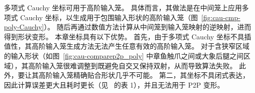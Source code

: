 多项式 Cauchy 坐标可用于高阶输入笼。
具体而言，其做法是在中间笼上应用多项式 Cauchy 坐标，以生成用于包围输入形状的高阶输入笼（图~\ref{fig:cau-cmp-poly-Cauchy}）。
随后再通过数值方法计算从中间笼到输入笼映射的逆映射，进而得到形状变形。
%
本章坐标具有以下优势。
首先，由于多项式 Cauchy 坐标不具插值性，其高阶输入笼生成方法无法产生任意有效的高阶输入笼。
对于含狭窄区域的输入形状（如图~\ref{fig:cau-comparep2p_poly} 中章鱼触爪之间或大象后腿之间区域），其高阶输入笼很难调整到既避免自交又保持双射，从而导致算法失败。
此外，要让其高阶输入笼精确贴合形状几乎不可能。
%
第二，其坐标不具闭式表达，因此计算误差更大且耗时更长（见~\cite{Lin2024PolynomialCC} 的表 1），并且无法用于 P2P 变形。

